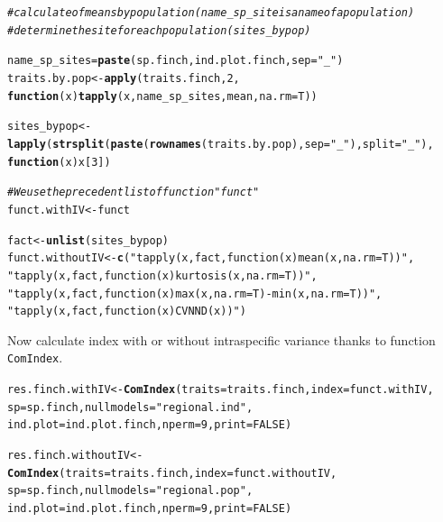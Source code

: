 \documentclass[12pt]{article}\usepackage[]{graphicx}\usepackage[]{color}
\makeatletter
\newcommand{\hlnum}[1]{\textcolor[rgb]{0.686,0.059,0.569}{#1}}%
\newcommand{\hlstr}[1]{\textcolor[rgb]{0.192,0.494,0.8}{#1}}%
\newcommand{\hlcom}[1]{\textcolor[rgb]{0.678,0.584,0.686}{\textit{#1}}}%
\newcommand{\hlstd}[1]{\textcolor[rgb]{0.345,0.345,0.345}{#1}}%
\newcommand{\hlkwa}[1]{\textcolor[rgb]{0.161,0.373,0.58}{\textbf{#1}}}%
\newcommand{\hlkwb}[1]{\textcolor[rgb]{0.69,0.353,0.396}{#1}}%
\newcommand{\hlkwc}[1]{\textcolor[rgb]{0.333,0.667,0.333}{#1}}%
\newcommand{\hlkwd}[1]{\textcolor[rgb]{0.737,0.353,0.396}{\textbf{#1}}}%
\newenvironment{kframe}{%
 \def\at@end@of@kframe{}%
 \ifinner\ifhmode%
  \def\at@end@of@kframe{\end{minipage}}%
  \begin{minipage}{\columnwidth}%
 \fi\fi%
 \def\FrameCommand##1{\hskip\@totalleftmargin \hskip-\fboxsep
 \colorbox{shadecolor}{##1}\hskip-\fboxsep
     \hskip-\linewidth \hskip-\@totalleftmargin \hskip\columnwidth}%
 \MakeFramed {\advance\hsize-\width
   \@totalleftmargin\z@ \linewidth\hsize
   \@setminipage}}%
 {\par\unskip\endMakeFramed%
 \at@end@of@kframe}
\newenvironment{knitrout}{}{} %
\makeatother
\begin{document}
\begin{knitrout}
\color{fgcolor}\begin{kframe}
\begin{alltt}
\hlcom{#calculate  of means by population (name_sp_site is a name of a population) }
\hlcom{#determine the site for each population (sites_bypop)}

\hlstd{name_sp_sites} \hlkwb{=} \hlkwd{paste}\hlstd{(sp.finch, ind.plot.finch,}\hlkwc{sep} \hlstd{=} \hlstr{"_"}\hlstd{)}
\hlstd{traits.by.pop}\hlkwb{<-}\hlkwd{apply}\hlstd{(traits.finch,} \hlnum{2} \hlstd{,}
           \hlkwa{function} \hlstd{(}\hlkwc{x}\hlstd{)} \hlkwd{tapply}\hlstd{(x, name_sp_sites, mean ,} \hlkwc{na.rm} \hlstd{= T))}

\hlstd{sites_bypop}\hlkwb{<-}\hlkwd{lapply}\hlstd{(}\hlkwd{strsplit}\hlstd{(}\hlkwd{paste}\hlstd{(}\hlkwd{rownames}\hlstd{(traits.by.pop),} \hlkwc{sep} \hlstd{=} \hlstr{"_"}\hlstd{),} \hlkwc{split} \hlstd{=} \hlstr{"_"}\hlstd{),}
          \hlkwa{function}\hlstd{(}\hlkwc{x}\hlstd{) x[}\hlnum{3}\hlstd{])}

\hlcom{#We use the precedent list of function "funct"}
\hlstd{funct.withIV}\hlkwb{<-}\hlstd{funct}

\hlstd{fact}\hlkwb{<-}\hlkwd{unlist}\hlstd{(sites_bypop)}
\hlstd{funct.withoutIV}\hlkwb{<-}\hlkwd{c}\hlstd{(}\hlstr{"tapply(x, fact, function(x) mean(x, na.rm = T))"}\hlstd{,}
          \hlstr{"tapply(x, fact, function(x) kurtosis(x, na.rm = T))"}\hlstd{,}
          \hlstr{"tapply(x, fact, function(x) max(x, na.rm = T)-min(x, na.rm = T))"}\hlstd{,}
          \hlstr{"tapply(x, fact, function(x) CVNND(x))"}\hlstd{)}
\end{alltt}
\end{kframe}
\end{knitrout}

Now calculate index with or without intraspecific variance thanks to function \texttt{ComIndex}.
\begin{knitrout}
\color{fgcolor}\begin{kframe}
\begin{alltt}
\hlstd{res.finch.withIV}\hlkwb{<-}\hlkwd{ComIndex}\hlstd{(}\hlkwc{traits} \hlstd{= traits.finch,} \hlkwc{index} \hlstd{= funct.withIV,}
               \hlkwc{sp} \hlstd{= sp.finch,} \hlkwc{nullmodels} \hlstd{=} \hlstr{"regional.ind"}\hlstd{,}
               \hlkwc{ind.plot} \hlstd{= ind.plot.finch,} \hlkwc{nperm} \hlstd{=} \hlnum{9}\hlstd{,} \hlkwc{print} \hlstd{=} \hlnum{FALSE}\hlstd{)}

\hlstd{res.finch.withoutIV}\hlkwb{<-}\hlkwd{ComIndex}\hlstd{(}\hlkwc{traits} \hlstd{= traits.finch,} \hlkwc{index} \hlstd{= funct.withoutIV,}
               \hlkwc{sp} \hlstd{= sp.finch,} \hlkwc{nullmodels} \hlstd{=} \hlstr{"regional.pop"}\hlstd{,}
               \hlkwc{ind.plot} \hlstd{= ind.plot.finch,} \hlkwc{nperm} \hlstd{=} \hlnum{9}\hlstd{,} \hlkwc{print} \hlstd{=} \hlnum{FALSE}\hlstd{)}
\end{alltt}
\end{kframe}
\end{knitrout}
\end{document}
